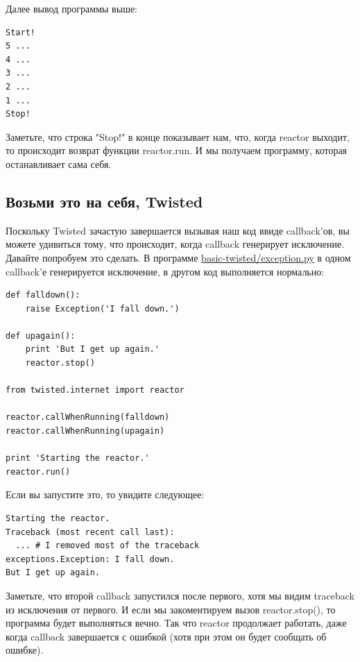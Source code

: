 Далее вывод программы выше:

\begin{scriptsize}\begin{verbatim}
Start!
5 ...
4 ...
3 ...
2 ...
1 ...
Stop!
\end{verbatim}\end{scriptsize}


Заметьте, что строка "Stop!" в конце показывает нам, что, 
когда reactor выходит, то происходит возврат функции reactor.run. 
И мы получаем программу, которая останавливает сама себя.


\subsection{Возьми это на себя, Twisted}

Поскольку Twisted зачастую завершается вызывая наш код ввиде 
callback'ов, вы можете удивиться тому, что происходит, когда 
callback генерирует исключение. Давайте попробуем это сделать. 
В программе 
\href{http://github.com/jdavisp3/twisted-intro/blob/master/basic-twisted/exception.py}{basic-twisted/exception.py} 
в одном callback'е генерируется исключение, в другом код выполняется нормально:

\begin{scriptsize}\begin{verbatim}
def falldown():
    raise Exception('I fall down.')

def upagain():
    print 'But I get up again.'
    reactor.stop()

from twisted.internet import reactor

reactor.callWhenRunning(falldown)
reactor.callWhenRunning(upagain)

print 'Starting the reactor.'
reactor.run()
\end{verbatim}\end{scriptsize}


Если вы запустите это, то увидите следующее:

\begin{scriptsize}\begin{verbatim}
Starting the reactor.
Traceback (most recent call last):
  ... # I removed most of the traceback
exceptions.Exception: I fall down.
But I get up again.
\end{verbatim}\end{scriptsize}


Заметьте, что второй callback запустился после первого, хотя 
мы видим traceback из исключения от первого. И если мы 
закоментируем вызов reactor.stop(), то программа будет 
выполняться вечно. Так что reactor продолжает работать, даже когда 
callback завершается с ошибкой (хотя при этом он будет сообщать об ошибке). 



